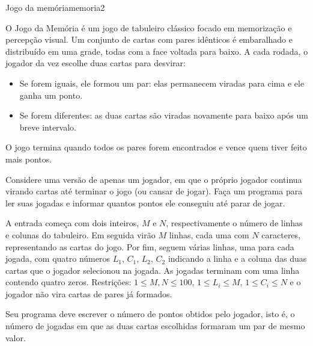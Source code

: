 \documentclass[12pt,a4paper,oneside]{article}
\begin{document}
\begin{problem}{Jogo da memória}{memoria}{2}

O Jogo da Memória é um jogo de tabuleiro clássico focado em memorização e percepção visual.
Um conjunto de cartas com pares idênticos é embaralhado e distribuído em uma grade, todas com a face voltada para baixo.
A cada rodada, o jogador da vez escolhe duas cartas para desvirar:

\begin{itemize}
\vspace{-9pt}
\item Se forem iguais, ele formou um par: elas permanecem viradas para cima e ele ganha um ponto.
\vspace{-9pt}
\item Se forem diferentes: as duas cartas são viradas novamente para baixo após um breve intervalo.
\end{itemize}

\vspace{-9pt}
O jogo termina quando todos os pares forem encontrados e vence quem tiver feito mais pontos.

Considere uma versão de apenas um jogador, em que o próprio jogador continua virando cartas até terminar o jogo (ou cansar de jogar).
Faça um programa para ler suas jogadas e informar quantos pontos ele conseguiu até parar de jogar.

%

\InputFile

A entrada começa com dois inteiros, $M$ e $N$, respectivamente o número de linhas e colunas do tabuleiro.
Em seguida virão $M$ linhas, cada uma com $N$ caracteres, representando as cartas do jogo.
Por fim, seguem várias linhas, uma para cada jogada, com quatro números $L_1$, $C_1$, $L_2$, $C_2$ indicando a linha e a coluna das duas cartas que o jogador selecionou na jogada.
As jogadas terminam com uma linha contendo quatro zeros.
Restrições: $1 \leq M, N \leq 100$, $1 \leq L_i \leq M$, $1 \leq C_i \leq N$ e o jogador não vira cartas de pares já formados.

\OutputFile

Seu programa deve escrever o número de pontos obtidos pelo jogador, isto é, o número de jogadas em que as duas cartas escolhidas formaram um par de mesmo valor.


\Example

\begin{example}
%
\end{example}


\end{problem}
\end{document}
